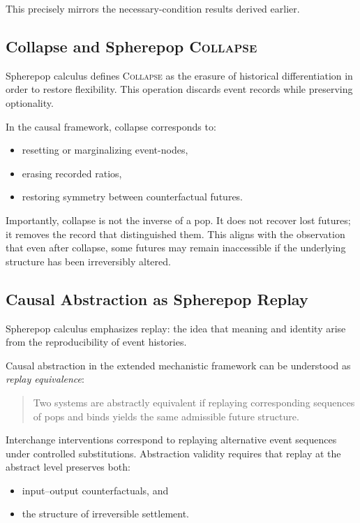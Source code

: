 \documentclass[11pt]{article}
\begin{document}
This precisely mirrors the necessary-condition results derived earlier.

\subsection{Collapse and Spherepop \textsc{Collapse}}

Spherepop calculus defines \textsc{Collapse} as the erasure of historical
differentiation in order to restore flexibility. This operation discards event
records while preserving optionality.

In the causal framework, collapse corresponds to:
\begin{itemize}
\item resetting or marginalizing event-nodes,
\item erasing recorded ratios,
\item restoring symmetry between counterfactual futures.
\end{itemize}

Importantly, collapse is not the inverse of a pop. It does not recover lost
futures; it removes the record that distinguished them. This aligns with the
observation that even after collapse, some futures may remain inaccessible if
the underlying structure has been irreversibly altered.

\subsection{Causal Abstraction as Spherepop Replay}

Spherepop calculus emphasizes replay: the idea that meaning and identity arise
from the reproducibility of event histories.

Causal abstraction in the extended mechanistic framework can be understood as
\emph{replay equivalence}:
\begin{quote}
Two systems are abstractly equivalent if replaying corresponding sequences of
pops and binds yields the same admissible future structure.
\end{quote}

Interchange interventions correspond to replaying alternative event sequences
under controlled substitutions. Abstraction validity requires that replay at
the abstract level preserves both:
\begin{itemize}
\item input–output counterfactuals, and
\item the structure of irreversible settlement.
\end{itemize}
\end{document}
